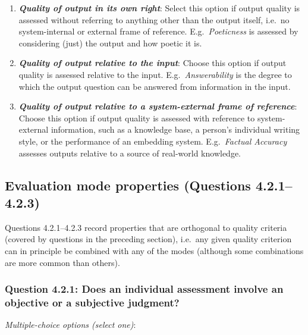 \documentclass[11pt,a4paper]{article}
\newcommand{\egcvalue}[1]{\textbf{\textit{#1}}}
\begin{document}
\begin{enumerate}[itemsep=0cm,leftmargin=0.5cm,label={\LARGE $\circ$}]
    \item \egcvalue{Quality of output in its own right}: Select this option if output quality is assessed without referring to anything other than the output itself, i.e.\ no  system-internal or external frame of reference. E.g.\ \textit{Poeticness} is assessed by considering (just) the output and how poetic it is.
    \item \egcvalue{Quality of output relative to the input}: Choose this option if output quality is assessed  relative to the input. E.g.\ \textit{Answerability} is the degree to which the output question can be answered from information in the input.
    \item \egcvalue{Quality of output relative to a system-external frame of reference}: Choose this option if output quality is assessed with reference to system-external information, such as a knowledge base, a person’s individual writing style, or the performance of an embedding system. E.g.\ \textit{Factual Accuracy} assesses outputs relative to a source of real-world knowledge.
\end{enumerate}
    

    
\subsection{Evaluation mode properties (Questions 4.2.1--4.2.3)}

Questions 4.2.1--4.2.3 record properties that are orthogonal to quality criteria (covered by questions in the preceding section), i.e.\ any given quality criterion can in principle be combined with any of the modes (although some combinations are more common than others).

\vspace{-.3cm}
\subsubsection*{Question 4.2.1: Does an individual assessment involve an objective or a subjective judgment?}

\noindent\textit{Multiple-choice options (select one)}:  
\vspace{-.1cm}
\end{document}
